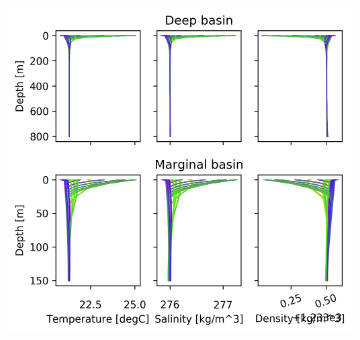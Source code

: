 \documentclass[twocolumn]{article}
\begin{document}
\begin{figure}
\begin{subfigure}[h]{0.7\textwidth}
\centering
\includegraphics[width=\textwidth,keepaspectratio]{with_adv_150m.png}
\end{subfigure}\hfill
\begin{subfigure}[h]{0.20\textwidth}
\centering

\end{subfigure}
\end{figure}
\end{document}
